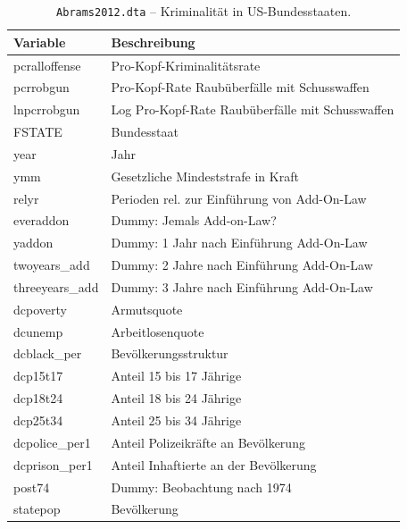 \documentclass[
  a4paper,
  DIV=11,
  oneside]{scrreprt}
\begin{document}
\begin{longtable}{@{\extracolsep{\fill}}ll}

\caption{\label{tbl-abrams2012vars}\texttt{Abrams2012.dta} --
Kriminalität in US-Bundesstaaten.}

\tabularnewline

\toprule
Variable & Beschreibung \\ 
\midrule\addlinespace[2.5pt]
pcralloffense & Pro-Kopf-Kriminalitätsrate \\ 
pcrrobgun & Pro-Kopf-Rate Raubüberfälle mit Schusswaffen \\ 
lnpcrrobgun & Log Pro-Kopf-Rate Raubüberfälle mit Schusswaffen \\ 
FSTATE & Bundesstaat \\ 
year & Jahr \\ 
ymm & Gesetzliche Mindeststrafe in Kraft \\ 
relyr & Perioden rel. zur Einführung von Add-On-Law \\ 
everaddon & Dummy: Jemals Add-on-Law? \\ 
yaddon & Dummy: 1 Jahr nach Einführung Add-On-Law \\ 
twoyears\_add & Dummy: 2 Jahre nach Einführung Add-On-Law \\ 
threeyears\_add & Dummy: 3 Jahre nach Einführung Add-On-Law \\ 
dcpoverty & Armutsquote \\ 
dcunemp & Arbeitlosenquote \\ 
dcblack\_per & Bevölkerungsstruktur \\ 
dcp15t17 & Anteil 15 bis 17 Jährige \\ 
dcp18t24 & Anteil 18 bis 24 Jährige \\ 
dcp25t34 & Anteil 25 bis 34 Jährige \\ 
dcpolice\_per1 & Anteil Polizeikräfte an Bevölkerung \\ 
dcprison\_per1 & Anteil Inhaftierte an der Bevölkerung \\ 
post74 & Dummy: Beobachtung nach 1974 \\ 
statepop & Bevölkerung \\ 
\bottomrule

\end{longtable}

\endgroup
\end{document}
